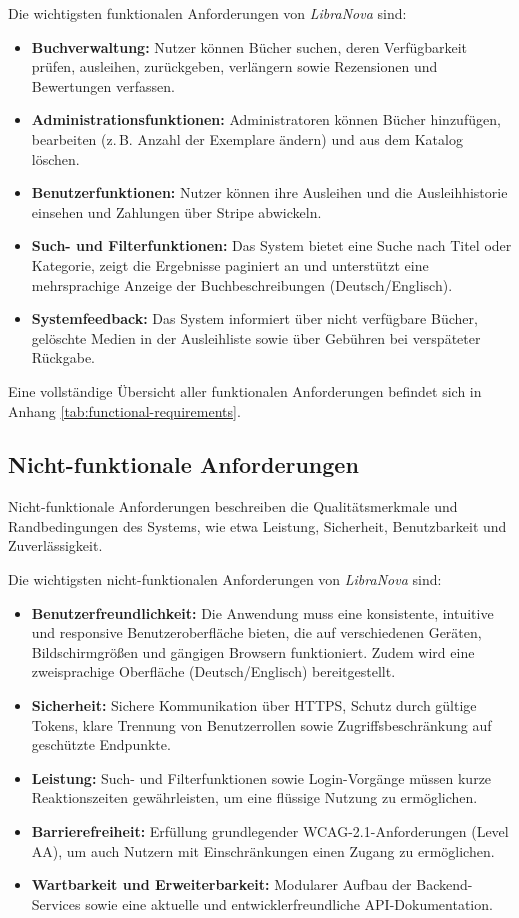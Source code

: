\noindent Die wichtigsten funktionalen Anforderungen von \textit{LibraNova} sind:
\begin{itemize}
	\item \textbf{Buchverwaltung:} Nutzer können Bücher suchen, deren Verfügbarkeit prüfen, ausleihen, zurückgeben, verlängern sowie Rezensionen und Bewertungen verfassen.  
	\item \textbf{Administrationsfunktionen:} Administratoren können Bücher hinzufügen, bearbeiten (z.\,B. Anzahl der Exemplare ändern) und aus dem Katalog löschen.  
	\item \textbf{Benutzerfunktionen:} Nutzer können ihre Ausleihen und die Ausleihhistorie einsehen und Zahlungen über Stripe abwickeln.  
	\item \textbf{Such- und Filterfunktionen:} Das System bietet eine Suche nach Titel oder Kategorie, zeigt die Ergebnisse paginiert an und unterstützt eine mehrsprachige Anzeige der Buchbeschreibungen (Deutsch/Englisch).  
	\item \textbf{Systemfeedback:} Das System informiert über nicht verfügbare Bücher, gelöschte Medien in der Ausleihliste sowie über Gebühren bei verspäteter Rückgabe.  
\end{itemize}

\noindent Eine vollständige Übersicht aller funktionalen Anforderungen befindet sich in Anhang \ref{tab:functional-requirements}.

\subsection{Nicht-funktionale Anforderungen}

Nicht-funktionale Anforderungen beschreiben die Qualitätsmerkmale und Randbedingungen des Systems, wie etwa Leistung, Sicherheit, Benutzbarkeit und Zuverlässigkeit.

\noindent Die wichtigsten nicht-funktionalen Anforderungen von \textit{LibraNova} sind:

\begin{itemize}
	\item \textbf{Benutzerfreundlichkeit:} Die Anwendung muss eine konsistente, intuitive und responsive Benutzeroberfläche bieten, die auf verschiedenen Geräten, Bildschirmgrößen und gängigen Browsern funktioniert. Zudem wird eine zweisprachige Oberfläche (Deutsch/Englisch) bereitgestellt.  
	\item \textbf{Sicherheit:} Sichere Kommunikation über HTTPS, Schutz durch gültige Tokens, klare Trennung von Benutzerrollen sowie Zugriffsbeschränkung auf geschützte Endpunkte.  
	\item \textbf{Leistung:} Such- und Filterfunktionen sowie Login-Vorgänge müssen kurze Reaktionszeiten gewährleisten, um eine flüssige Nutzung zu ermöglichen.  
	\item \textbf{Barrierefreiheit:} Erfüllung grundlegender WCAG-2.1-Anforderungen (Level AA), um auch Nutzern mit Einschränkungen einen Zugang zu ermöglichen.  
	\item \textbf{Wartbarkeit und Erweiterbarkeit:} Modularer Aufbau der Backend-Services sowie eine aktuelle und entwicklerfreundliche API-Dokumentation.  
\end{itemize}

